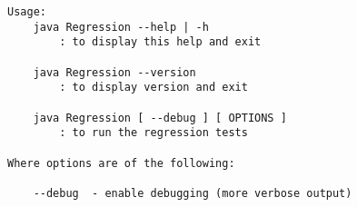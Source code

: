 \begin{verbatim}
Usage:
    java Regression --help | -h
        : to display this help and exit

    java Regression --version
        : to display version and exit

    java Regression [ --debug ] [ OPTIONS ]
        : to run the regression tests

Where options are of the following:

    --debug  - enable debugging (more verbose output)


\end{verbatim}
